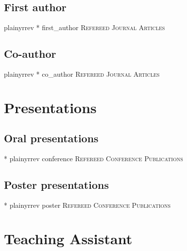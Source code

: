 \documentclass[11pt,a4paper,sans]{moderncv} %
\begin{document}
\vspace{0.5em}
\subsection{First author}
{plainyrrev}
\nocite{first_author}{*}
{first_author}
{\large \textsc{Refereed Journal Articles}}

\vspace{0.5em}
\subsection{Co-author}
{plainyrrev}
\nocite{co_author}{*}
{co_author}
{\large \textsc{Refereed Journal Articles}}



\section{Presentations}
\subsection{Oral presentations}
\nocite{conference}{*}
{plainyrrev}
{conference}
{\large \textsc{Refereed Conference Publications}}

\subsection{Poster presentations}
\nocite{poster}{*}
{plainyrrev}
{poster}
{\large \textsc{Refereed Conference Publications}}




\section{Teaching Assistant}
\end{document}
